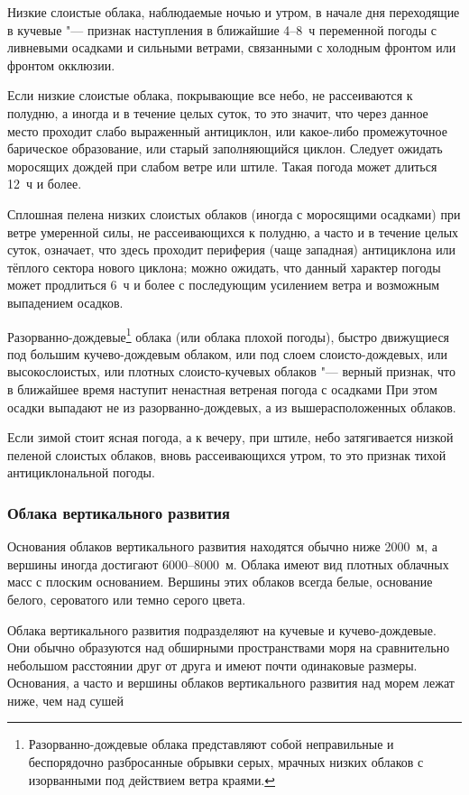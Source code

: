  Низкие слоистые облака, наблюдаемые ночью и утром, в начале дня
переходящие в кучевые "--- признак наступления в ближайшие 4--8~ч
переменной погоды с ливневыми осадками и сильными ветрами, связанными
с холодным фронтом или фронтом окклюзии.

 Если низкие слоистые облака, покрывающие все небо, не
рассеиваются к полудню, а иногда и в течение целых суток, то это
значит, что через данное место проходит слабо выраженный антициклон,
или какое-либо промежуточное барическое образование, или старый
заполняющийся циклон. Следует ожидать моросящих дождей при слабом
ветре или штиле. Такая погода может длиться 12~ч и более.

 Сплошная пелена низких слоистых облаков (иногда с моросящими
осадками) при ветре умеренной силы, не рассеивающихся к полудню, а
часто и в течение целых суток, означает, что здесь проходит периферия
(чаще западная) антициклона или тёплого сектора нового циклона; можно
ожидать, что данный характер погоды может продлиться 6~ч и более с
последующим усилением ветра и возможным выпадением осадков.

 Разорванно-дождевые\footnote{Разорванно-дождевые облака
  представляют собой неправильные и беспорядочно разбросанные обрывки
  серых, мрачных низких облаков с изорванными под действием ветра
  краями.} облака (или облака плохой погоды), быстро движущиеся под
большим кучево-дождевым облаком, или под слоем слоисто-дождевых, или
высокослоистых, или плотных слоисто-кучевых облаков "--- верный
признак, что в ближайшее время наступит ненастная ветреная погода с
осадками При этом осадки выпадают не из разорванно-дождевых, а из
вышерасположенных облаков.

 Если зимой стоит ясная погода, а к вечеру, при штиле, небо
затягивается низкой пеленой слоистых облаков, вновь рассеивающихся
утром, то это признак тихой антициклональной погоды.

\subsubsection{Облака вертикального развития}

Основания облаков вертикального развития находятся обычно ниже 2000~м,
а вершины иногда достигают 6000--8000~м. Облака имеют вид плотных
облачных масс с плоским основанием. Вершины этих облаков всегда белые,
основание белого, сероватого или темно серого цвета.

Облака вертикального развития подразделяют на кучевые и
кучево-дождевые. Они обычно образуются над обширными пространствами
моря на сравнительно небольшом расстоянии друг от друга и имеют почти
одинаковые размеры. Основания, а часто и вершины облаков вертикального
развития над морем лежат ниже, чем над сушей


